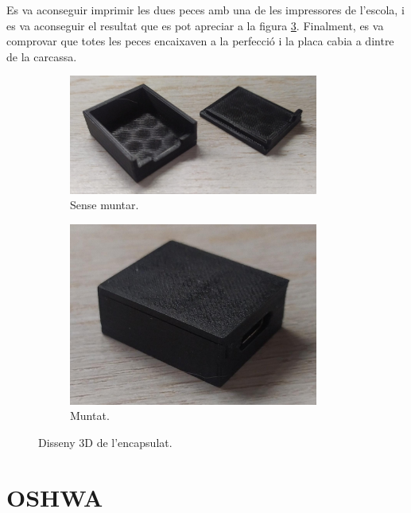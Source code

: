Es va aconseguir imprimir les dues peces amb una de les impressores de
l'escola, i es va aconseguir el resultat que es pot apreciar a la figura
\ref{fig:3d_real}. Finalment, es va comprovar que totes les peces encaixaven a la
perfecció i la placa cabia a dintre de la carcassa.

\begin{figure}[ht]
    \centering
    \begin{subfigure}{0.50\textwidth}
        \centering
        \includegraphics[width=0.9\textwidth]{images/device/3d_unmounted.jpeg}
        \caption{Sense muntar.}
        \label{fig:3d_real_unmounted}
    \end{subfigure}
    \begin{subfigure}{0.4\textwidth}
        \centering
        \includegraphics[width=0.9\textwidth]{images/device/3d_mounted.jpeg}
        \caption{Muntat.}
        \label{fig:3d_real_mounted}
    \end{subfigure}
    \caption{Disseny 3D de l'encapsulat.}
    \label{fig:3d_real}
\end{figure}

\section{OSHWA}

